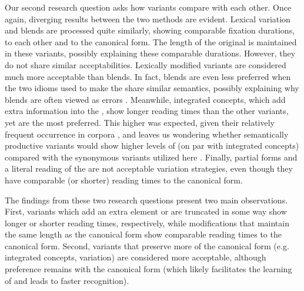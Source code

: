 \documentclass[output=paper
,modfonts
,nonflat]{langsci/langscibook}
\begin{document}
Our second research question asks how variants compare with each other. Once again, diverging results between the two methods are evident.  Lexical variation and  blends are processed quite similarly, showing comparable fixation durations, to each other and to the canonical form. The length of the original  is maintained in these variants, possibly explaining these comparable durations. However, they do not share similar acceptabilities.  Lexically modified variants  are considered much more acceptable than  blends. In fact,  blends  are even less preferred when the two idioms used to make the  share similar semantics, possibly explaining why blends are often viewed as errors \citep{Fay1982, CuttingBock1997}. Meanwhile, integrated concepts,  which add extra information into the , show longer reading times than the other variants, yet are the most preferred. This higher  was expected, given their relatively frequent occurrence in corpora \citep{Moon1998, Schroder2013}, and leaves us wondering whether semantically productive  variants  \citep[cf.][]{McGloneEtAl1994} would show higher levels of  (on par with integrated concepts) compared with the synonymous  variants utilized here \citep[following][]{GibbsEtAl1989}. Finally, partial forms  and a literal reading  of the  are not acceptable variation strategies, even though they have comparable (or shorter) reading times to the canonical form.

The findings from these two research questions present two main observations. First, variants  which add an extra element or are truncated in some way show longer or shorter reading times, respectively, while modifications that maintain the same length as the canonical form show comparable reading times to the canonical form. Second, variants that preserve more of the canonical form (e.g. integrated concepts,  variation) are considered more acceptable, although preference remains with the canonical form (which likely facilitates the learning of  and leads to faster recognition).
\end{document}
